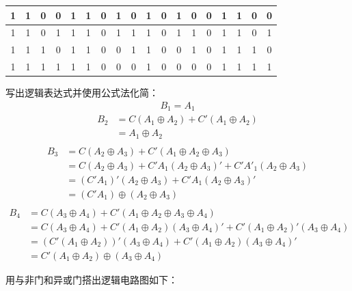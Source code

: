 \documentclass{ctexart}
\begin{document}
\begin{table}[!ht]
\begin{tabular}{|cccc|c|cccc||cccc|c|cccc|}
1     & 1     & 0     & 0     & 1 & 1     & 0     & 1     & 0     & 1     & 0     & 1     & 0     & 0 & 1     & 1     & 0     & 0     \\ \hline
1     & 1     & 0     & 1     & 1 & 1     & 0     & 1     & 1     & 1     & 0     & 1     & 1     & 0 & 1     & 1     & 0     & 1     \\ \hline
1     & 1     & 1     & 0     & 1 & 1     & 0     & 0     & 1     & 1     & 0     & 0     & 1     & 0 & 1     & 1     & 1     & 0     \\ \hline
1     & 1     & 1     & 1     & 1 & 1     & 0     & 0     & 0     & 1     & 0     & 0     & 0     & 0 & 1     & 1     & 1     & 1     \\ \hline
\end{tabular}
\end{table}

写出逻辑表达式并使用公式法化简：
\begin{align*}
    B_1=A_1  
\end{align*}
\begin{align*}
   B_2&=C(A_1\oplus A_2)+C'(A_1 \oplus A_2) \\
        &=A_1\oplus A_2 \\ 
\end{align*}
\begin{align*}
    B_3&=C(A_2\oplus A_3)+C'(A_1\oplus A_2 \oplus A_3) \\
    &=C(A_2\oplus A_3)+C'A_1(A_2 \oplus A_3)'+C'A'_1(A_2 \oplus A_3) \\
    &=(C'A_1)'(A_2\oplus A_3)+C'A_1(A_2 \oplus A_3)' \\
    &=(C'A_1)\oplus(A_2\oplus A_3) \\
\end{align*}
\begin{align*}
    B_4&=C(A_3\oplus A_4)+C'(A_1\oplus A_2 \oplus A_3 \oplus A_4) \\
    &=C(A_3\oplus A_4)+C'(A_1\oplus A_2)(A_3 \oplus A_4)'+C'(A_1\oplus A_2)'(A_3 \oplus A_4) \\
    &=(C'(A_1\oplus A_2))'(A_3 \oplus A_4)+C'(A_1\oplus A_2)(A_3 \oplus A_4)' \\
    &=C'(A_1\oplus A_2)\oplus(A_3 \oplus A_4)
\end{align*}

用与非门和异或门搭出逻辑电路图如下：
\end{document}
